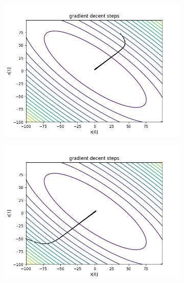 	\begin{figure}[h!]
		\centering
		\begin{subfigure}[b]{0.45\linewidth}
			\includegraphics[width=\linewidth]{photos/booth1.png}
		\end{subfigure}
		\begin{subfigure}[b]{0.45\linewidth}
			\includegraphics[width=\linewidth]{photos/booth2.png}
		\end{subfigure}
		\begin{subfigure}[b]{0.45\linewidth}

\end{subfigure}
\end{figure}
